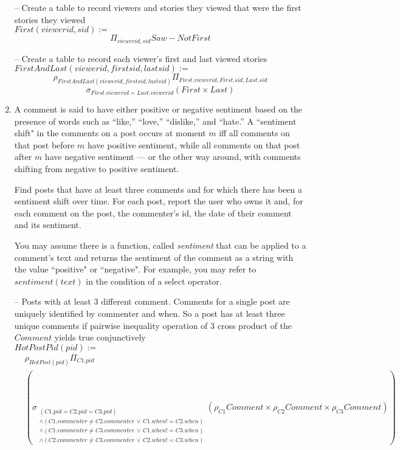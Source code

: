 \documentclass{article}
\newcommand{\var}[1]{\mathit{#1}}
\begin{document}
\begin{enumerate}
{    -- Create a table to record viewers and stories they viewed that were the first stories they viewed \\
    $\var{First}(viewerid,sid):=$
    \[
        \Pi_{viewerid,sid} \var{Saw} - NotFirst
    \]
    
    -- Create a table to record each viewer's first and last viewed stories \\
    $\var{FirstAndLast}(viewerid,firstsid,lastsid) :=$
    \[
        \rho_{\var{FirstAndLast}(viewerid,firstsid,lastsid)}
        \Pi_{First.viewerid, First.sid, Last.sid}
    \]
    \[
        \sigma_{
                First.viewerid = Last.viewerid
        }
        (\var{First} \times \var{Last})
    \] 
    
    
    }





\item   %
A comment is said to have either positive or negative sentiment
based on the presence of words such as ``like,'' ``love,'' ``dislike,'' and ``hate.'' 
A ``sentiment shift" in the comments on a post occurs at moment $m$ iff
all comments on that post before $m$ have positive sentiment, 
while all comments on that post after $m$ have negative sentiment ---
or the other way around, with comments shifting from negative to positive sentiment.

Find posts that have at least three comments and for which there has been a sentiment shift over time. 
For each post, report the user who owns it and,
for each comment on the post,
the commenter's id, 
the date of their comment and its sentiment.

You may assume there is a function, called {\it sentiment}
that can be applied to a comment's text and 
returns the sentiment of the comment as a string with the value ``positive" or ``negative".
For example,
you may refer to $sentiment(text)$ in the condition of a select operator.



{\large 


-- Posts with at least 3 different comment. Comments for a single post are uniquely identified by commenter and when. So a post has at least three unique comments if pairwise inequality operation of 3 cross product of the $\var{Comment}$ yields true conjunctively\\ 
$\var{HotPostPid}(pid) :=$ 
\begin{align*}
    & \rho_{\var{HotPost}(pid)} \Pi_{C1.pid} \\ 
    &
    \left(
        \sigma_{
            \substack{
                (C1.pid=C2.pid=C3.pid) \\ 
                \land (C1.commenter\neq C2.commenter \,\lor\, C1.when!=C2.when)\\
                \land (C1.commenter\neq C3.commenter \,\lor\, C1.when!=C3.when)\\
                \land (C2.commenter\neq C3.commenter \,\lor\, C2.when!=C3.when)
            }
        }
        (\rho_{C1} \var{Comment} \times \rho_{C2} \var{Comment} \times \rho_{C3} \var{Comment})
    \right)
\end{align*}


}
\end{enumerate}
\end{document}

